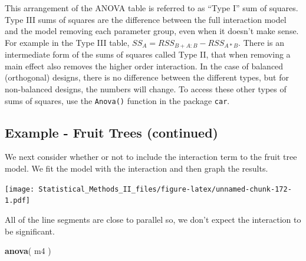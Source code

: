 \documentclass[]{book}
\newenvironment{Shaded}{\begin{snugshade}}{\end{snugshade}}
\newcommand{\KeywordTok}[1]{\textcolor[rgb]{0.13,0.29,0.53}{\textbf{{#1}}}}
\newcommand{\DataTypeTok}[1]{\textcolor[rgb]{0.13,0.29,0.53}{{#1}}}
\newcommand{\DecValTok}[1]{\textcolor[rgb]{0.00,0.00,0.81}{{#1}}}
\newcommand{\StringTok}[1]{\textcolor[rgb]{0.31,0.60,0.02}{{#1}}}
\newcommand{\NormalTok}[1]{{#1}}
\theoremstyle{definition}
\theoremstyle{definition}
\theoremstyle{remark}
\begin{document}
This arrangement of the ANOVA table is referred to as ``Type I'' sum of
squares. Type III sums of squares are the difference between the full
interaction model and the model removing each parameter group, even when
it doesn't make sense. For example in the Type III table,
\(SS_{A}=RSS_{B+A:B}-RSS_{A*B}\). There is an intermediate form of the
sums of squares called Type II, that when removing a main effect also
removes the higher order interaction. In the case of balanced
(orthogonal) designs, there is no difference between the different
types, but for non-balanced designs, the numbers will change. To access
these other types of sums of squares, use the \texttt{Anova()} function
in the package \texttt{car}.

\subsection{Example - Fruit Trees
(continued)}\label{example---fruit-trees-continued}

We next consider whether or not to include the interaction term to the
fruit tree model. We fit the model with the interaction and then graph
the results.

\begin{Shaded}
\end{Shaded}

\texttt{[image: Statistical\_Methods\_II\_files/figure-latex/unnamed-chunk-172-1.pdf]}

All of the line segments are close to parallel so, we don't expect the
interaction to be significant.

\begin{Shaded}
\begin{Highlighting}[]
\KeywordTok{anova}\NormalTok{( m4 )}
\end{Highlighting}
\end{Shaded}
\end{document}
